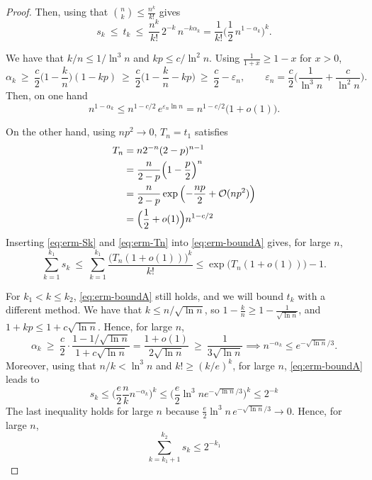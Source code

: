 \documentclass{article}
\theoremstyle{plain}
\theoremstyle{definition}
\theoremstyle{remark}
\begin{document}
\begin{proof}
Then, using that $\binom nk\le\frac{n^k}{k!}$ gives
\begin{equation}\label{eq:erm-boundA}
s_k\ \le\ t_k\ \le\ \frac{n^k}{k!}\,2^{-k}\,n^{-k\alpha_k}=\frac1{k!}\Big(\frac12\,n^{1-\alpha_k}\Big)^k .
\end{equation}

We have that $k/n\le1/\ln^3n$ and $kp\le c/\ln^2n$. Using $\frac1{1+x}\ge1-x$ for $x>0$,
\begin{equation}
\alpha_k\ \ge\ \frac c2\Big(1-\frac kn\Big)(1-kp)\ \ge\ \frac c2\Big(1-\frac kn-kp\Big)\ \ge\ \frac c2-\varepsilon_n,
\qquad \varepsilon_n=\frac c2\Big(\frac1{\ln^3n}+\frac c{\ln^2n}\Big).
\end{equation}
Then, on one hand
\begin{equation}
n^{1-\alpha_k}\le n^{1-c/2}\,e^{\varepsilon_n\ln n}=n^{1-c/2}\big(1+o(1)\big).
\label{eq:erm-Sk}
\end{equation}

On the other hand, using $np^2\to0$, $T_n=t_1$ satisfies
\begin{align}
T_n&=n2^{-n}(2-p)^{n-1} \\
&=\frac{n}{2-p}\Bigl(1-\frac{p}{2}\Bigr)^n \\
&=\frac{n}{2-p} \exp\left(-\frac{np}{2} + \mathcal{O}(np^2)\right) \\
&= \Big(\frac{1}{2} + o(1)\Big)n^{1-c/2}
\label{eq:erm-Tn}
\end{align}
Inserting \eqref{eq:erm-Sk} and \eqref{eq:erm-Tn} into \eqref{eq:erm-boundA} gives, for large $n$,
\begin{equation}
\sum_{k=1}^{k_1}s_k\ \le\ \sum_{k=1}^{k_1}\frac{\big(T_n(1+o(1))\big)^k}{k!}\leq\exp\big(T_n(1+o(1))\big)-1. \label{eq:region-1}
\end{equation}

\medskip
\noindent
For $k_1 < k \leq k_2$, \eqref{eq:erm-boundA} still holds, and we will bound $t_k$ with a different method. We have that $k\le n/\sqrt{\ln n}$, so $1-\frac kn\ge1-\frac1{\sqrt{\ln n}}$, and $1+kp\le1+c\sqrt{\ln n}$. Hence, for large $n$,
\begin{equation}
\alpha_k\ \ge\ \frac c2\cdot\frac{1-1/\sqrt{\ln n}}{1+c\sqrt{\ln n}}=\frac{1+o(1)}{2\sqrt{\ln n}}\ \ge\ \frac1{3\sqrt{\ln n}} \implies n^{-\alpha_k}\le e^{-\sqrt{\ln n}/3}.
\end{equation} Moreover, using that $n/k<\ln^3n$ and $k!\ge(k/e)^k$, for large $n$, \eqref{eq:erm-boundA} leads to
\begin{equation}
s_k \leq \Big(\frac e2 \frac nk n^{-\alpha_k}\Big)^k \leq \Big(\frac e2 \ln^3n e^{-\sqrt{\ln n}/3}\Big)^k \leq 2^{-k}
\end{equation}
The last inequality holds for large $n$ because $\frac e2\ln^3n\,e^{-\sqrt{\ln n}/3}\to0$. Hence, for large $n$, \begin{equation}
    \sum_{k=k_1+1}^{k_2}s_k\le2^{-k_1} \label{eq:region-2}
\end{equation}


\end{proof}
\end{document}
